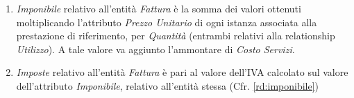 			{\color{red}{Da correggere di qui in poi.}}
			
			\begin{enumerate}

				\item \label{rd:imponibile} \emph{Imponibile} relativo all'entità \emph{Fattura} è la somma dei valori ottenuti moltiplicando l'attributo \emph{Prezzo Unitario} di ogni istanza associata alla prestazione di riferimento, per \emph{Quantità} (entrambi relativi alla relationship \emph{Utilizzo}). A tale valore va aggiunto l'ammontare di \emph{Costo Servizi}.

				\item \label{rd:imposte} \emph{Imposte} relativo all'entità \emph{Fattura} è pari al valore dell'IVA calcolato sul valore dell'attributo \emph{Imponibile}, relativo all'entità stessa (Cfr. \ref{rd:imponibile})
				
			\end{enumerate}
